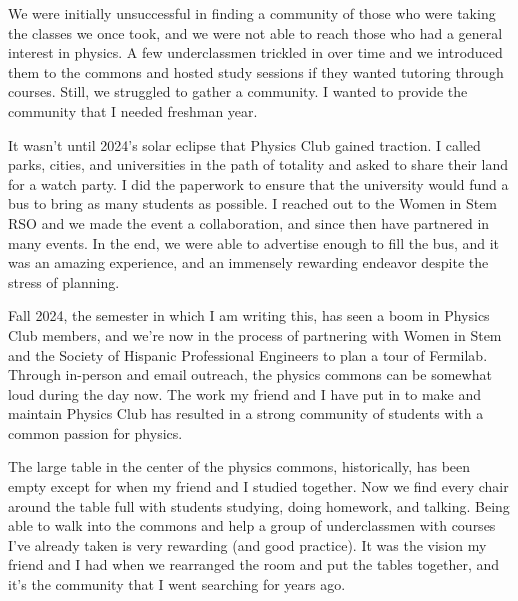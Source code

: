\documentclass[11pt]{article}
\begin{document}
We were initially unsuccessful in finding a community of those who were taking the classes we once took, and we were not able to reach those who had a general interest in physics. A few underclassmen trickled in over time and we introduced them to the commons and hosted study sessions if they wanted tutoring through courses. Still, we struggled to gather a community. I wanted to provide the community that I needed freshman year.

It wasn't until 2024's solar eclipse that Physics Club gained traction. I called parks, cities, and universities in the path of totality and asked to share their land for a watch party. I did the paperwork to ensure that the university would fund a bus to bring as many students as possible. I reached out to the Women in Stem RSO and we made the event a collaboration, and since then have partnered in many events. In the end, we were able to advertise enough to fill the bus, and it was an amazing experience, and an immensely rewarding endeavor despite the stress of planning.

Fall 2024, the semester in which I am writing this, has seen a boom in Physics Club members, and we're now in the process of partnering with Women in Stem and the Society of Hispanic Professional Engineers to plan a tour of Fermilab. Through in-person and email outreach, the physics commons can be somewhat loud during the day now. The work my friend and I have put in to make and maintain Physics Club has resulted in a strong community of students with a common passion for physics.

The large table in the center of the physics commons, historically, has been empty except for when my friend and I studied together. Now we find every chair around the table full with students studying, doing homework, and talking. Being able to walk into the commons and help a group of underclassmen with courses I've already taken is very rewarding (and good practice). It was the vision my friend and I had when we rearranged the room and put the tables together, and it's the community that I went searching for years ago.
\end{document}
